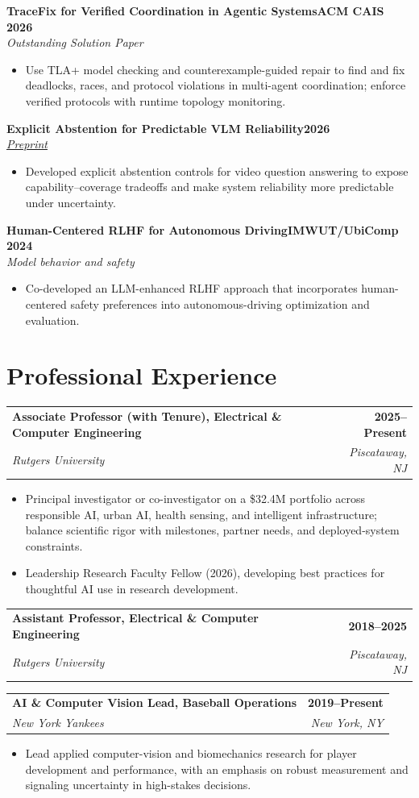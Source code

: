 \documentclass[10pt,letterpaper]{article}
\makeatletter
\newcommand{\role}[4]{%
  \par\noindent
  \begin{tabularx}{\textwidth}{@{}Xr@{}}
    \textbf{\color{ink}#1} & \textbf{\color{muted}#2}\\
    \textit{\color{muted}#3} & \textit{\color{muted}#4}
  \end{tabularx}\par
}
\newcommand{\project}[3]{%
  \par\noindent
  \textbf{\color{ink}#1}\hfill\textbf{\color{muted}#2}\\[-1pt]
  \textit{\color{muted}#3}\par
}
\makeatother
\begin{document}
\project{TraceFix for Verified Coordination in Agentic Systems}{ACM CAIS 2026}
{Outstanding Solution Paper}
\begin{itemize}
  \item Use TLA+ model checking and counterexample-guided repair to find and fix deadlocks, races, and protocol violations in multi-agent coordination; enforce verified protocols with runtime topology monitoring.
\end{itemize}

\project{Explicit Abstention for Predictable VLM Reliability}{2026}
{\href{https://arxiv.org/abs/2601.00138}{Preprint}}
\begin{itemize}
  \item Developed explicit abstention controls for video question answering to expose capability--coverage tradeoffs and make system reliability more predictable under uncertainty.
\end{itemize}

\project{Human-Centered RLHF for Autonomous Driving}{IMWUT/UbiComp 2024}
{Model behavior and safety}
\begin{itemize}
  \item Co-developed an LLM-enhanced RLHF approach that incorporates human-centered safety preferences into autonomous-driving optimization and evaluation.
\end{itemize}

\section{Professional Experience}

\role{Associate Professor (with Tenure), Electrical \& Computer Engineering}{2025--Present}
{Rutgers University}{Piscataway, NJ}
\begin{itemize}
  \item Principal investigator or co-investigator on a \$32.4M portfolio across responsible AI, urban AI, health sensing, and intelligent infrastructure; balance scientific rigor with milestones, partner needs, and deployed-system constraints.
  \item Leadership Research Faculty Fellow (2026), developing best practices for thoughtful AI use in research development.
\end{itemize}

\role{Assistant Professor, Electrical \& Computer Engineering}{2018--2025}
{Rutgers University}{Piscataway, NJ}

\role{AI \& Computer Vision Lead, Baseball Operations}{2019--Present}
{New York Yankees}{New York, NY}
\begin{itemize}
  \item Lead applied computer-vision and biomechanics research for player development and performance, with an emphasis on robust measurement and signaling uncertainty in high-stakes decisions.
\end{itemize}
\end{document}
